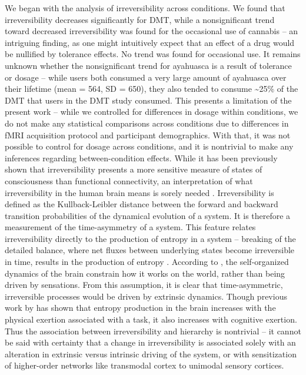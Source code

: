We began with the analysis of irreversibility across conditions. We found that irreversibility decreases significantly for DMT, while a nonsignificant trend toward decreased irreversibility was found for the occasional use of cannabis -- an intriguing finding, as one might intuitively expect that an effect of a drug would be nullified by tolerance effects. No trend was found for occasional use.  It remains unknown whether the nonsignificant trend for ayahuasca is a result of tolerance or dosage -- while users both consumed a very large amount of ayahuasca over their lifetime (mean = 564, SD = 650), they also tended to consume \textasciitilde25\% of the DMT that users in the DMT study consumed. This presents a limitation of the present work -- while we controlled for differences in dosage within conditions, we do not make any statistical comparisons across conditions due to differences in fMRI acquisition protocol and participant demographics. With that, it was not possible to control for dosage across conditions, and it is nontrivial to make any inferences regarding between-condition effects. While it has been previously shown that irreversibility presents a more sensitive measure of states of consciousness than functional connectivity, an interpretation of what irreversibility in the human brain means is sorely needed \parencite{Deco2022,Kringelbach2023}. Irreversibility is defined as the Kullback-Leibler distance between the forward and backward transition probabilities of the dynamical evolution of a system. It is therefore a measurement of the time-asymmetry of a system. This feature relates irreversibility directly to the production of entropy in a system -- breaking of the detailed balance, where net fluxes between underlying states become irreversible in time, results in the production of entropy \parencite{Deco2022}. According to \textcite{Buzsaki2019}, the self-organized dynamics of the brain constrain how it works on the world, rather than being driven by sensations. From this assumption, it is clear that time-asymmetric, irreversible processes would be driven by extrinsic dynamics. Though previous work by \textcite{Lynn2021} has shown that entropy production in the brain increases with the physical exertion associated with a task, it also increases with cognitive exertion. Thus the association between irreversibility and hierarchy is nontrivial -- it cannot be said with certainty that a change in irreversibility is associated solely with an alteration in extrinsic versus intrinsic driving of the system, or with sensitization of higher-order networks like transmodal cortex to unimodal sensory cortices.


